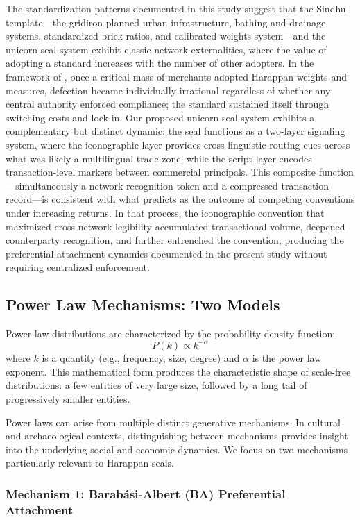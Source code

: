 \documentclass[12pt]{article}
\begin{document}
The standardization patterns documented in this study suggest that the Sindhu
template---the gridiron-planned urban infrastructure, bathing and drainage systems,
standardized brick ratios, and calibrated weights system---and the unicorn
seal system exhibit classic network externalities, where the value of adopting
a standard increases with the number of other adopters. In the framework of
\citet{katz1985network}, once a critical mass of merchants adopted Harappan
weights and measures, defection became individually irrational regardless of
whether any central authority enforced compliance; the standard sustained
itself through switching costs and lock-in. Our proposed unicorn seal system
exhibits a complementary but distinct dynamic: the seal functions as a two-layer
signaling system, where the iconographic layer provides cross-linguistic routing
cues across what was likely a multilingual trade zone, while the script layer
encodes transaction-level markers between commercial principals. This composite
function---simultaneously a network recognition token and a compressed transaction
record---is consistent with what \citet{arthur1989competing} predicts as the
outcome of competing conventions under increasing returns. In that process, the
iconographic convention that maximized cross-network legibility accumulated
transactional volume, deepened counterparty recognition, and further entrenched
the convention, producing the preferential attachment dynamics documented in the
present study without requiring centralized enforcement.

\subsection{Power Law Mechanisms: Two Models}

Power law distributions are characterized by the probability density function:
\[
P(k) \propto k^{-\alpha}
\]
where $k$ is a quantity (e.g., frequency, size, degree) and $\alpha$ is the
power law exponent. This mathematical form produces the characteristic shape
of scale-free distributions: a few entities of very large size, followed by
a long tail of progressively smaller entities.

Power laws can arise from multiple distinct generative mechanisms. In cultural
and archaeological contexts, distinguishing between mechanisms provides insight
into the underlying social and economic dynamics. We focus on two mechanisms
particularly relevant to Harappan seals.

\subsubsection{Mechanism 1: Barab{\'a}si-Albert (BA) Preferential Attachment}
\end{document}
